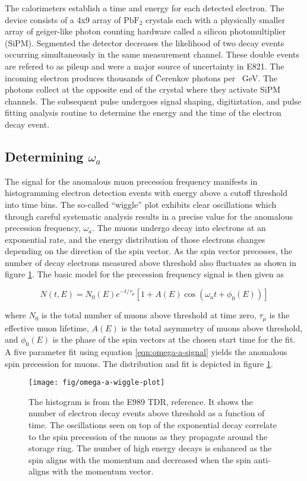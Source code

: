 The calorimeters establish a time and energy for each detected electron.  The device consists of a 4x9 array of $\mathrm{PbF_2}$ crystals each with a physically smaller array of geiger-like photon counting hardware called a silicon photomultiplier (SiPM).  Segmented the detector decreases the likelihood of two decay events occurring simultaneously in the same measurement channel.  These double events are refered to as pileup and were a major source of uncertainty in E821.  The incoming electron produces thousands of \v{C}erenkov photons per \SI{}{\GeV}.  The photons collect at the opposite end of the crystal where they activate SiPM channels.  The subsequent pulse undergoes signal shaping, digitiztation, and pulse fitting analysis routine to determine the energy and the time of the electron decay event.  

\subsection{Determining $\omega_a$}

The signal for the anomalous muon precession frequency manifests in histogramming electron detection events with energy above a cutoff threshold into time bins. The so-called ``wiggle'' plot exhibits clear oscillations which through careful systematic analysis results in a precise value for the anomalous precession frequency, $\omega_a$.  The muons undergo decay into electrons at an exponential rate, and the energy distribution of those electrons changes depending on the direction of the spin vector.  As the spin vector precesses, the number of decay electrons measured above threshold also fluctuates as shown in figure \ref{fig:omega-a-wiggle-plot}.  The basic model for the precession frequency signal is then given as 

\begin{equation}
\label{eqn:omega-a-signal}
N(t, E) = N_0(E) e^{-t/\tau_\mu} \left[ 1 + A(E) \cos(\omega_a t + \phi_0(E))\right]
\end{equation}

where $N_0$ is the total number of muons above threshold at time zero, $\tau_\mu$ is the effective muon lifetime, $A(E)$ is the total asymmetry of muons above threshold, and $\phi_0(E)$ is the phase of the spin vectors at the chosen start time for the fit.  A five parameter fit using equation \ref{eqn:omega-a-signal} yields the anomalous spin precession for muons.  The distribution and fit is depicted in figure \ref{fig:omega-a-wiggle-plot}.

\begin{figure}
\texttt{[image: fig/omega-a-wiggle-plot]}
\caption{The histogram is from the E989 TDR, reference\cite{e989-tdr}.  It shows the number of electron decay events above threshold as a function of time.  The oscillations seen on top of the exponential decay correlate to the spin precession of the muons as they propagate around the storage ring.  The number of high energy decays is enhanced as the spin aligns with the momentum and decreased when the spin anti-aligns with the momentum vector. \label{fig:omega-a-wiggle-plot}}
\end{figure}
